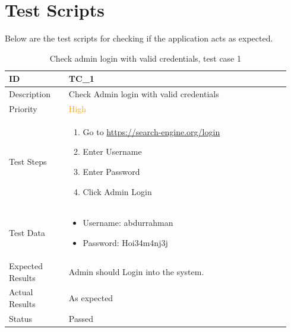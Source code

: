\documentclass{scrartcl}
\begin{document}
\section{Test Scripts}

Below are the test scripts for checking if the application acts as expected.

\begin{table}[H]
  \caption{Check admin login with valid credentials, test case 1}
  \begin{tabular}{p{0.2\linewidth} | p{0.74\linewidth}}
    \toprule
    ID & TC\_1
    \\\midrule
    Description & Check Admin login with valid credentials
    \\\hline
    Priority & \textcolor{orange}{High}
    \\\hline
    Test Steps & {
                 \begin{enumerate}
                 \item Go to \url{https://search-engine.org/login}
                 \item Enter Username
                 \item Enter Password
                 \item Click Admin Login
                 \end{enumerate}
                 }\vspace*{-\baselineskip}
    \\\hline
    Test Data & {
                \begin{itemize}
                \item Username: abdurrahman
                \item Password: Hoi34m4nj3j
                \end{itemize}
                }\vspace*{-\baselineskip}
    \\\hline
    Expected Results & Admin should Login into the system.
    \\\hline
    Actual Results & As expected
    \\\hline
    Status & Passed
    \\\bottomrule
  \end{tabular}
\end{table}
\end{document}
